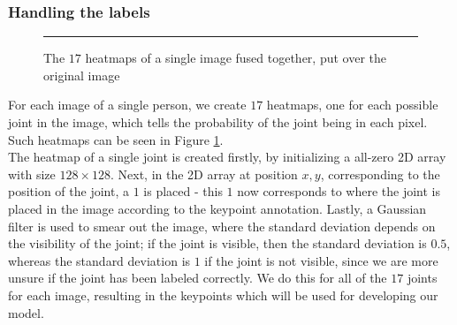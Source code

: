 \documentclass[main.tex]{subfiles}
\begin{document}
\subsubsection{Handling the labels}
\begin{figure}[H]
    \centering
    \rule{1cm}{1cm} %
    \caption{The $17$ heatmaps of a single image fused together, put over the original image}
    \label{fig:heatmaps}
\end{figure}
For each image of a single person, we create $17$ heatmaps, one for each possible joint in the image, which tells the probability of the joint being in each pixel. Such heatmaps can be seen in Figure \ref{fig:heatmaps}. \\
The heatmap of a single joint is created firstly, by initializing a all-zero 2D array with size $128 \times 128$. Next, in the 2D array at position $x, y$, corresponding to the position of the joint, a $1$ is placed - this $1$ now corresponds to where the joint is placed in the image according to the keypoint annotation. Lastly, a Gaussian filter is used to smear out the image, where the standard deviation depends on the visibility of the joint; if the joint is visible, then the standard deviation is $0.5$, whereas the standard deviation is $1$ if the joint is not visible, since we are more unsure if the joint has been labeled correctly. We do this for all of the $17$ joints for each image, resulting in the keypoints which will be used for developing our model.
\end{document}
